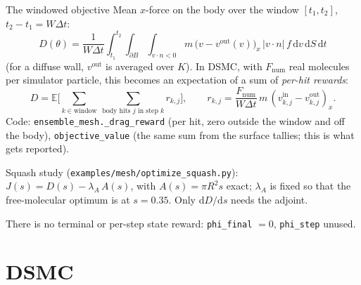 \documentclass[10pt,aspectratio=169]{beamer}
\newcommand{\E}{\mathbb{E}}
\newcommand{\dd}{\mathrm{d}}
\newcommand{\code}[1]{\texttt{\small #1}}
\begin{document}
\begin{frame}{The windowed objective}
Mean $x$-force on the body over the window $[t_1, t_2]$, $t_2 - t_1 = W\Delta t$:
\[
D(\theta) = \frac{1}{W\Delta t}\int_{t_1}^{t_2}\!\!\int_{\partial B}\int_{v\cdot n<0}
m\,\big(v - v^{\mathrm{out}}(v)\big)_x\, |v\cdot n|\, f\,\dd v\,\dd S\,\dd t
\]
(for a diffuse wall, $v^{\mathrm{out}}$ is averaged over $K$).  In DSMC, with $F_{\mathrm{num}}$ real molecules per simulator particle,
this becomes an expectation of a sum of \emph{per-hit rewards}:
\[
D = \E\Big[\sum_{k\in\text{window}}\ \sum_{\text{body hits } j \text{ in step } k}
r_{k,j}\Big],\qquad
r_{k,j} = \frac{F_{\mathrm{num}}}{W\Delta t}\, m\,(v^{\mathrm{in}}_{k,j} - v^{\mathrm{out}}_{k,j})_x .
\]
Code: \code{ensemble\_mesh.\_drag\_reward} (per hit, zero outside the window and off the body),
\code{objective\_value} (the same sum from the surface tallies; this is what gets reported).

\medskip
Squash study (\code{examples/mesh/optimize\_squash.py}): $J(s) = D(s) - \lambda_A\, A(s)$,
with $A(s) = \pi R^2 s$ exact; $\lambda_A$ is fixed so that the free-molecular optimum is at
$s = 0.35$.  Only $\dd D/\dd s$ needs the adjoint.

\medskip
There is no terminal or per-step state reward: \code{phi\_final} $= 0$, \code{phi\_step} unused.
\end{frame}

\section{DSMC}
\end{document}
